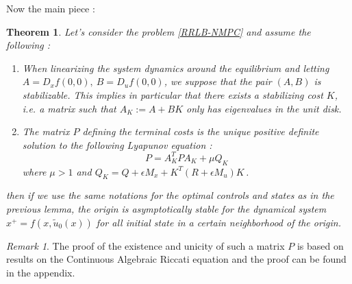 \documentclass[12pt]{article}
\newtheorem{theorem}{Theorem}[section]
\theoremstyle{definition}
\theoremstyle{remark}
\newtheorem*{remark}{Remark}
\newcommand{\inv}[1]{#1^{-1}}
\begin{document}
Now the main piece :

\begin{theorem}
	Let's consider the problem \ref{RRLB-NMPC} and assume the following :
	\begin{enumerate}
		\item When linearizing the system dynamics around the equilibrium and letting $A=D_xf(0,0),~B=D_uf(0,0)$, we suppose that the pair $(A,B)$ is stabilizable.
		This implies in particular that there exists a stabilizing cost $K$, i.e. a matrix such that $A_K:=A+BK$ only has eigenvalues in the unit disk.
		\item The matrix $P$ defining the terminal costs is the unique positive definite solution to the following Lyapunov equation :
		\begin{equation}
			P=A_K^TPA_K+\mu Q_K
		\end{equation}
		where $\mu>1$ and $Q_K=Q+\epsilon M_x+K^T(R+\epsilon M_u)K$\,.
	\end{enumerate}	
	then if we use the same notations for the optimal controls and states as in the previous lemma, the origin is asymptotically stable for the dynamical system $x^+=f(x,\tilde{u}_0(x))$ for all initial state in a certain neighborhood of the origin.
\end{theorem}

\begin{remark}
	The proof of the existence and unicity of such a matrix $P$ is based on results on the Continuous Algebraic Riccati equation and the proof can be found in the appendix.
\end{remark}
\end{document}
